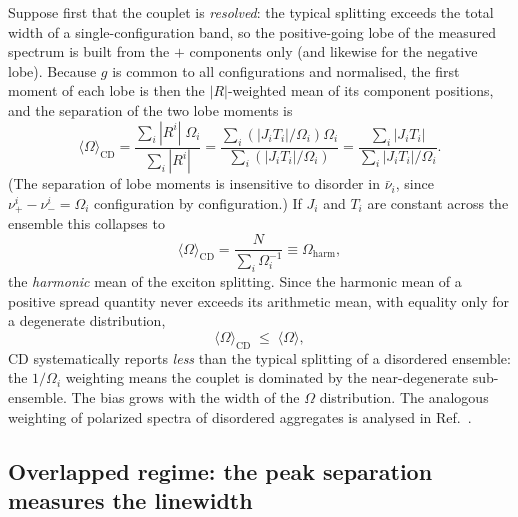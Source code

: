 \documentclass[11pt,a4paper]{article}
\begin{document}
Suppose first that the couplet is \emph{resolved}: the typical splitting
exceeds the total width of a single-configuration band, so the positive-going
lobe of the measured spectrum is built from the $+$ components only (and
likewise for the negative lobe). Because $g$ is common to all configurations
and normalised, the first moment of each lobe is then the $|R|$-weighted mean
of its component positions, and the separation of the two lobe moments is
\begin{equation}
\langle\Omega\rangle_{\mathrm{CD}}
=\frac{\sum_{i}|R^{i}|\;\Omega_{i}}{\sum_{i}|R^{i}|}
=\frac{\sum_{i}\left(|J_{i}T_{i}|/\Omega_{i}\right)\Omega_{i}}
       {\sum_{i}\left(|J_{i}T_{i}|/\Omega_{i}\right)}
=\frac{\sum_{i} |J_{i}T_{i}|}{\sum_{i} |J_{i}T_{i}|/\Omega_{i}} .
\label{eq:weighted}
\end{equation}
(The separation of lobe moments is insensitive to disorder in $\bar\nu_i$,
since $\nu^{i}_{+}-\nu^{i}_{-}=\Omega_i$ configuration by configuration.) If
$J_{i}$ and $T_{i}$ are constant across the ensemble this collapses to
\begin{equation}
\langle\Omega\rangle_{\mathrm{CD}}
=\frac{N}{\sum_{i}\Omega_{i}^{-1}}
\equiv \Omega_{\mathrm{harm}},
\label{eq:harmonic}
\end{equation}
the \emph{harmonic} mean of the exciton splitting. Since the harmonic mean of a
positive spread quantity never exceeds its arithmetic mean, with equality only
for a degenerate distribution,
\begin{equation}
\langle\Omega\rangle_{\mathrm{CD}}\;\le\;\langle\Omega\rangle ,
\end{equation}
CD systematically reports \emph{less} than the typical splitting of a
disordered ensemble: the $1/\Omega_i$ weighting means the couplet is dominated
by the near-degenerate sub-ensemble. The bias grows with the width of the
$\Omega$ distribution. The analogous weighting of polarized spectra of
disordered aggregates is analysed in Ref.~\cite{somsen1996}.

\subsection{Overlapped regime: the peak separation measures the linewidth}
\label{sec:overlap}
\end{document}
